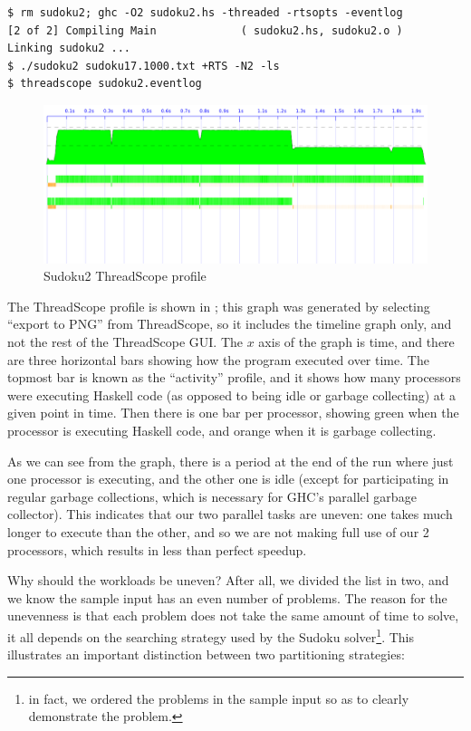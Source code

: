 {\small \begin{verbatim}
$ rm sudoku2; ghc -O2 sudoku2.hs -threaded -rtsopts -eventlog
[2 of 2] Compiling Main             ( sudoku2.hs, sudoku2.o )
Linking sudoku2 ...
$ ./sudoku2 sudoku17.1000.txt +RTS -N2 -ls
$ threadscope sudoku2.eventlog
\end{verbatim}}

\begin{figure}
\begin{center}
\includegraphics[scale=0.4]{sudoku2.png}
\end{center}
\caption{Sudoku2 ThreadScope profile}
\label{fig:sudoku2-threadscope}
\end{figure}

The ThreadScope profile is shown in ;
this graph was generated by selecting ``export to PNG'' from
ThreadScope, so it includes the timeline graph only, and not the rest
of the ThreadScope GUI.  The $x$ axis of the graph is time, and there
are three horizontal bars showing how the program executed over time.
The topmost bar is known as the ``activity'' profile, and it shows how
many processors were executing Haskell code (as opposed to being idle
or garbage collecting) at a given point in time.  Then there is one
bar per processor, showing green when the processor is executing
Haskell code, and orange when it is garbage collecting.

As we can see from the graph, there is a period at the end of the run
where just one processor is executing, and the other one is idle
(except for participating in regular garbage collections, which is
necessary for GHC's parallel garbage collector).  This indicates that
our two parallel tasks are uneven: one takes much longer to execute
than the other, and so we are not making full use of our 2 processors,
which results in less than perfect speedup.

Why should the workloads be uneven?  After all, we divided the list in
two, and we know the sample input has an even number of problems.  The
reason for the unevenness is that each problem does not take the same
amount of time to solve, it all depends on the searching strategy used
by the Sudoku solver\footnote{in fact, we ordered the problems in the
  sample input so as to clearly demonstrate the problem.}.  This
illustrates an important distinction between two partitioning
strategies:

